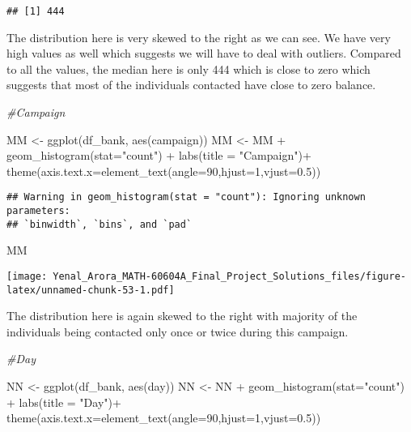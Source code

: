 \documentclass[
]{article}
\newenvironment{Shaded}{\begin{snugshade}}{\end{snugshade}}
\newcommand{\AttributeTok}[1]{\textcolor[rgb]{0.77,0.63,0.00}{#1}}
\newcommand{\CommentTok}[1]{\textcolor[rgb]{0.56,0.35,0.01}{\textit{#1}}}
\newcommand{\DecValTok}[1]{\textcolor[rgb]{0.00,0.00,0.81}{#1}}
\newcommand{\FloatTok}[1]{\textcolor[rgb]{0.00,0.00,0.81}{#1}}
\newcommand{\FunctionTok}[1]{\textcolor[rgb]{0.00,0.00,0.00}{#1}}
\newcommand{\NormalTok}[1]{#1}
\newcommand{\OtherTok}[1]{\textcolor[rgb]{0.56,0.35,0.01}{#1}}
\newcommand{\SpecialCharTok}[1]{\textcolor[rgb]{0.00,0.00,0.00}{#1}}
\newcommand{\StringTok}[1]{\textcolor[rgb]{0.31,0.60,0.02}{#1}}
\begin{document}
\begin{verbatim}
## [1] 444
\end{verbatim}

The distribution here is very skewed to the right as we can see. We have
very high values as well which suggests we will have to deal with
outliers. Compared to all the values, the median here is only 444 which
is close to zero which suggests that most of the individuals contacted
have close to zero balance.

\begin{Shaded}
\begin{Highlighting}[]
\CommentTok{\#Campaign}

\NormalTok{MM }\OtherTok{\textless{}{-}} \FunctionTok{ggplot}\NormalTok{(df\_bank, }\FunctionTok{aes}\NormalTok{(campaign))}
\NormalTok{MM }\OtherTok{\textless{}{-}}\NormalTok{ MM }\SpecialCharTok{+} \FunctionTok{geom\_histogram}\NormalTok{(}\AttributeTok{stat=}\StringTok{"count"}\NormalTok{) }\SpecialCharTok{+} \FunctionTok{labs}\NormalTok{(}\AttributeTok{title =} \StringTok{"Campaign"}\NormalTok{)}\SpecialCharTok{+}
  \FunctionTok{theme}\NormalTok{(}\AttributeTok{axis.text.x=}\FunctionTok{element\_text}\NormalTok{(}\AttributeTok{angle=}\DecValTok{90}\NormalTok{,}\AttributeTok{hjust=}\DecValTok{1}\NormalTok{,}\AttributeTok{vjust=}\FloatTok{0.5}\NormalTok{))}
\end{Highlighting}
\end{Shaded}

\begin{verbatim}
## Warning in geom_histogram(stat = "count"): Ignoring unknown parameters:
## `binwidth`, `bins`, and `pad`
\end{verbatim}

\begin{Shaded}
\begin{Highlighting}[]
\NormalTok{MM}
\end{Highlighting}
\end{Shaded}

\texttt{[image: Yenal\_Arora\_MATH-60604A\_Final\_Project\_Solutions\_files/figure-latex/unnamed-chunk-53-1.pdf]}

The distribution here is again skewed to the right with majority of the
individuals being contacted only once or twice during this campaign.

\begin{Shaded}
\begin{Highlighting}[]
\CommentTok{\#Day}

\NormalTok{NN }\OtherTok{\textless{}{-}} \FunctionTok{ggplot}\NormalTok{(df\_bank, }\FunctionTok{aes}\NormalTok{(day))}
\NormalTok{NN }\OtherTok{\textless{}{-}}\NormalTok{ NN }\SpecialCharTok{+} \FunctionTok{geom\_histogram}\NormalTok{(}\AttributeTok{stat=}\StringTok{"count"}\NormalTok{) }\SpecialCharTok{+} \FunctionTok{labs}\NormalTok{(}\AttributeTok{title =} \StringTok{"Day"}\NormalTok{)}\SpecialCharTok{+}
  \FunctionTok{theme}\NormalTok{(}\AttributeTok{axis.text.x=}\FunctionTok{element\_text}\NormalTok{(}\AttributeTok{angle=}\DecValTok{90}\NormalTok{,}\AttributeTok{hjust=}\DecValTok{1}\NormalTok{,}\AttributeTok{vjust=}\FloatTok{0.5}\NormalTok{))}
\end{Highlighting}
\end{Shaded}
\end{document}
